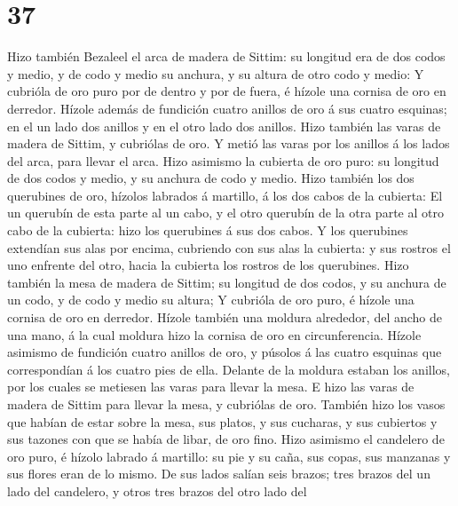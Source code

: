 \hypertarget{section-36}{%
\section{37}\label{section-36}}

 Hizo también Bezaleel el arca de madera de Sittim: su
longitud era de dos codos y medio, y de codo y medio su anchura, y su
altura de otro codo y medio:  Y cubrióla de oro puro por
de dentro y por de fuera, é hízole una cornisa de oro en derredor.
 Hízole además de fundición cuatro anillos de oro á sus
cuatro esquinas; en el un lado dos anillos y en el otro lado dos
anillos.  Hizo también las varas de madera de Sittim, y
cubriólas de oro.  Y metió las varas por los anillos á los
lados del arca, para llevar el arca.  Hizo asimismo la
cubierta de oro puro: su longitud de dos codos y medio, y su anchura de
codo y medio.  Hizo también los dos querubines de oro,
hízolos labrados á martillo, á los dos cabos de la cubierta:
 El un querubín de esta parte al un cabo, y el otro
querubín de la otra parte al otro cabo de la cubierta: hizo los
querubines á sus dos cabos.  Y los querubines extendían
sus alas por encima, cubriendo con sus alas la cubierta: y sus rostros
el uno enfrente del otro, hacia la cubierta los rostros de los
querubines.  Hizo también la mesa de madera de Sittim; su
longitud de dos codos, y su anchura de un codo, y de codo y medio su
altura;  Y cubrióla de oro puro, é hízole una cornisa de
oro en derredor.  Hízole también una moldura alrededor,
del ancho de una mano, á la cual moldura hizo la cornisa de oro en
circunferencia.  Hízole asimismo de fundición cuatro
anillos de oro, y púsolos á las cuatro esquinas que correspondían á los
cuatro pies de ella.  Delante de la moldura estaban los
anillos, por los cuales se metiesen las varas para llevar la mesa.
 E hizo las varas de madera de Sittim para llevar la
mesa, y cubriólas de oro.  También hizo los vasos que
habían de estar sobre la mesa, sus platos, y sus cucharas, y sus
cubiertos y sus tazones con que se había de libar, de oro fino.
 Hizo asimismo el candelero de oro puro, é hízolo labrado
á martillo: su pie y su caña, sus copas, sus manzanas y sus flores eran
de lo mismo.  De sus lados salían seis brazos; tres
brazos del un lado del candelero, y otros tres brazos del otro lado del
